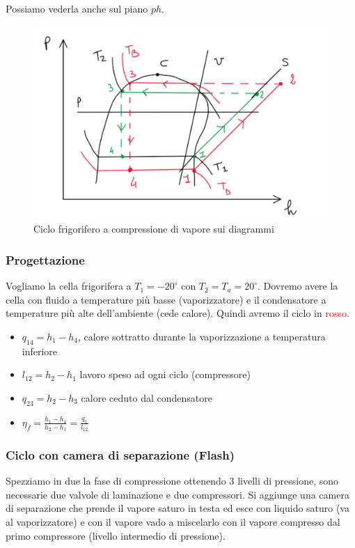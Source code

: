 \documentclass[a4paper]{article}
\numberwithin{equation}{section}%
\begin{document}
Possiamo vederla anche sul piano $ph$.

\begin{figure}[H]
	\begin{center}
		\includegraphics[width=0.5\columnwidth]{compressionedivaporeph.png}
	\end{center}
	\caption{Ciclo frigorifero a compressione di vapore sui diagrammi}
\end{figure}

\subsubsection{Progettazione}

Vogliamo la cella frigorifera a $T_1=-20^\circ$ con $T_2=T_a=20^\circ$.  Dovremo avere la cella con fluido a temperature più basse (vaporizzatore) e il condensatore a temperature più alte dell'ambiente (cede calore). Quindi avremo il ciclo in \textcolor{red}{rosso}.


\begin{itemize}
	\item $q_{14}=h_1-h_4$, calore sottratto durante la vaporizzazione a temperatura inferiore
	\item $l_{12}=h_2-h_1$ lavoro speso ad ogni ciclo (compressore)
	\item $q_{23}=h_2-h_3$ calore ceduto dal condensatore 
	\item $\eta_{f}=\frac{h_{1}-h_{4}}{h_{2}-h_{1}}=\frac{q_{1}}{l_{12}}$ 
\end{itemize}


\subsubsection{Ciclo con camera di separazione (Flash)}

Spezziamo in due la fase di compressione ottenendo 3 livelli di pressione, sono necessarie due valvole di laminazione e due compressori. Si aggiunge una camera di separazione che prende il vapore saturo in testa ed esce con liquido saturo (va al vaporizzatore) e con il vapore vado a miscelarlo con il vapore compresso dal primo compressore (livello intermedio di pressione). 
\end{document}
